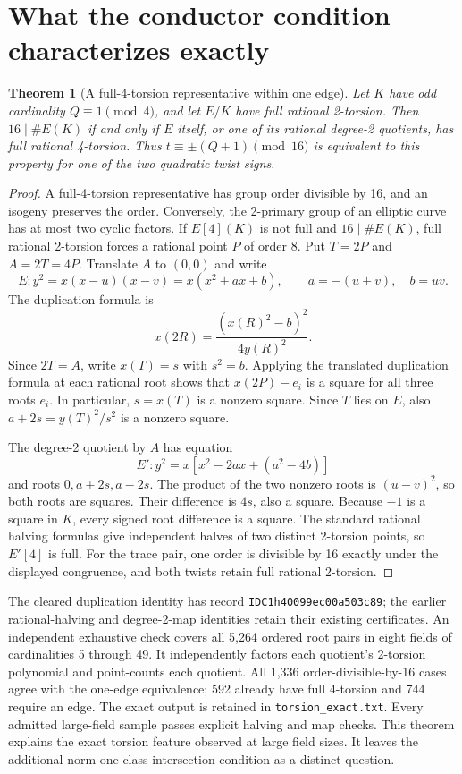 \documentclass[11pt]{article}
\newtheorem{theorem}{Theorem}
\begin{document}
\section{What the conductor condition characterizes exactly}
\begin{theorem}[A full-4-torsion representative within one edge]
Let $K$ have odd cardinality $Q\equiv1\pmod4$, and let $E/K$ have full
rational 2-torsion. Then $16\mid\#E(K)$ if and only if $E$ itself, or
one of its rational degree-2 quotients, has full rational 4-torsion.
Thus $t\equiv\pm(Q+1)\pmod {16}$ is equivalent to this property for
one of the two quadratic twist signs.
\end{theorem}
\begin{proof}
A full-4-torsion representative has group order divisible by 16,
and an isogeny preserves the order. Conversely, the 2-primary group
of an elliptic curve has at most two cyclic factors. If $E[4](K)$
is not full and $16\mid\#E(K)$, full rational 2-torsion forces a
rational point $P$ of order 8. Put $T=2P$ and $A=2T=4P$.
Translate $A$ to $(0,0)$ and write
\[
 E:y^2=x(x-u)(x-v)=x(x^2+ax+b),\qquad a=-(u+v),\quad b=uv.
\]
The duplication formula is
\[
 x(2R)=\frac{(x(R)^2-b)^2}{4y(R)^2}.
\]
Since $2T=A$, write $x(T)=s$ with $s^2=b$. Applying the translated
duplication formula at each rational root shows that $x(2P)-e_i$
is a square for all three roots $e_i$. In particular, $s=x(T)$ is
a nonzero square. Since $T$ lies on $E$, also
$a+2s=y(T)^2/s^2$ is a nonzero square.

The degree-2 quotient by $A$ has equation
\[
 E':y^2=x[x^2-2ax+(a^2-4b)]
\]
and roots $0,a+2s,a-2s$. The product of the two nonzero roots is
$(u-v)^2$, so both roots are squares. Their difference is $4s$,
also a square. Because $-1$ is a square in $K$, every signed root
difference is a square. The standard rational halving formulas give
independent halves of two distinct 2-torsion points, so $E'[4]$ is full.
For the trace pair, one order is divisible by 16 exactly under the
displayed congruence, and both twists retain full rational 2-torsion.
\end{proof}
The cleared duplication identity has record
\texttt{IDC1h40099ec00a503c89}; the earlier rational-halving and
degree-2-map identities retain their existing certificates.
An independent exhaustive check covers all 5,264 ordered root pairs in
eight fields of cardinalities 5 through 49. It independently factors each
quotient's 2-torsion polynomial and point-counts each quotient. All 1,336
order-divisible-by-16 cases agree with the one-edge equivalence; 592
already have full 4-torsion and 744 require an edge. The exact output is
retained in \texttt{torsion\_exact.txt}.
Every admitted large-field sample passes explicit halving and map checks. This theorem
explains the exact torsion feature observed at large field sizes. It leaves
the additional norm-one class-intersection condition as a distinct question.
\end{document}
